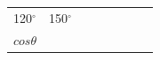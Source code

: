 \begin{center}
\begin{xtabular*}{\mytablewidth}[t]{|p{10\mystarwidth}|p{10\mystarwidth}|p{10\mystarwidth}|p{10\mystarwidth}|p{10\mystarwidth}|p{10\mystarwidth}|p{10\mystarwidth}|p{10\mystarwidth}|}
    
        120\begin{math}{}^{\circ }\end{math} &
    
    
        150\begin{math}{}^{\circ }\end{math} &
    
    
     \tabularnewline{}
    
    
        
                  \begin{math}cos\theta \end{math}
                 &
    
    
         &
    
    
         &
    
    
         &
    

\end{xtabular*}
\end{center}
